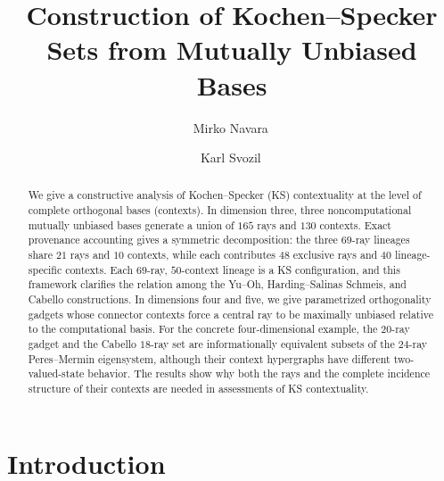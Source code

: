 \documentclass[%
  reprint,
  superscriptaddress,
  showpacs,
  showkeys,
  amsmath,amssymb,
  pra,
  longbibliography,
  floatfix,
  x11names
]{revtex4-2}
\newcommand{\rev}[1]{{\color{revisionblue}#1}}
\begin{document}
\title{Construction of Kochen--Specker Sets from Mutually Unbiased Bases}

\author{Mirko Navara\,}


\author{Karl Svozil\,}


\begin{abstract}
\rev{We give a constructive analysis of Kochen--Specker (KS) contextuality at the level of complete orthogonal bases (contexts). In dimension three, three noncomputational mutually unbiased bases generate a union of $165$ rays and $130$ contexts. Exact provenance accounting gives a symmetric decomposition: the three $69$-ray lineages share $21$ rays and $10$ contexts, while each contributes $48$ exclusive rays and $40$ lineage-specific contexts. Each $69$-ray, $50$-context lineage is a KS configuration, and this framework clarifies the relation among the Yu--Oh, Harding--Salinas Schmeis, and Cabello constructions. In dimensions four and five, we give parametrized orthogonality gadgets whose connector contexts force a central ray to be maximally unbiased relative to the computational basis. For the concrete four-dimensional example, the $20$-ray gadget and the Cabello $18$-ray set are informationally equivalent subsets of the $24$-ray Peres--Mermin eigensystem, although their context hypergraphs have different two-valued-state behavior. The results show why both the rays and the complete incidence structure of their contexts are needed in assessments of KS contextuality.}
\end{abstract}


\maketitle



\section{Introduction}
\end{document}
